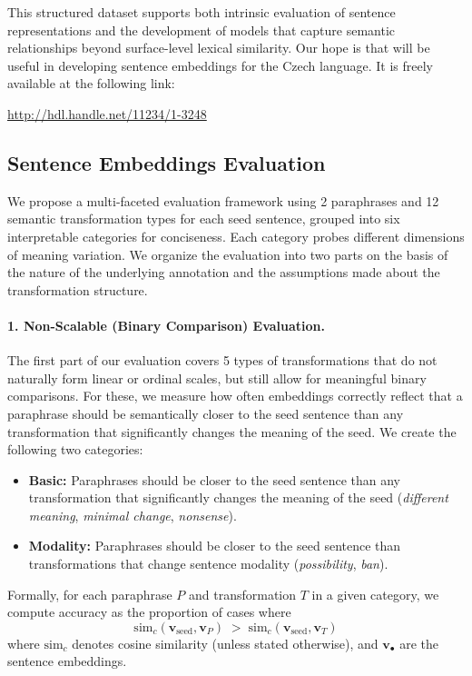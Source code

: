 This structured dataset supports both intrinsic evaluation of sentence representations and the development of models that capture semantic relationships beyond surface-level lexical similarity. Our hope is that \costra will be useful in developing sentence embeddings for the Czech language. It is freely available at the following link:
\begin{center}
\url{http://hdl.handle.net/11234/1-3248}\\
\end{center}


\subsection{Sentence Embeddings Evaluation}
We propose a multi-faceted evaluation framework using 2 paraphrases and 12 semantic transformation types for each seed sentence, grouped into six interpretable categories for conciseness. Each category probes different dimensions of meaning variation. We organize the evaluation into two parts on the basis of the nature of the underlying annotation and the assumptions made about the transformation structure.

\paragraph{1. Non-Scalable (Binary Comparison) Evaluation.} 
The first part of our evaluation covers 5 types of transformations that do not naturally form linear or ordinal scales, but still allow for meaningful binary comparisons. For these, we measure how often embeddings correctly reflect that a paraphrase should be semantically closer to the seed sentence than any transformation that significantly changes the meaning of the seed. We create the following two categories:

\begin{itemize}
    \item \textbf{Basic:} Paraphrases should be closer to the seed sentence than any transformation that significantly changes the meaning of the seed (\textit{different meaning}, \textit{minimal change}, \textit{nonsense}).
    \item \textbf{Modality:} Paraphrases should be closer to the seed sentence than transformations that change sentence modality  (\textit{possibility}, \textit{ban}).
\end{itemize}

Formally, for each paraphrase $P$ and transformation $T$ in a given category, we compute accuracy as the proportion of cases where
\[
\mathrm{sim}_c\!\left(\mathbf{v}_{\text{seed}}, \mathbf{v}_{P}\right) \;>\; \mathrm{sim}_c\!\left(\mathbf{v}_{\text{seed}}, \mathbf{v}_{T}\right)
\]
where $\mathrm{sim}_c$ denotes cosine similarity (unless stated otherwise), and $\mathbf{v}_{\bullet}$ are the sentence embeddings.

